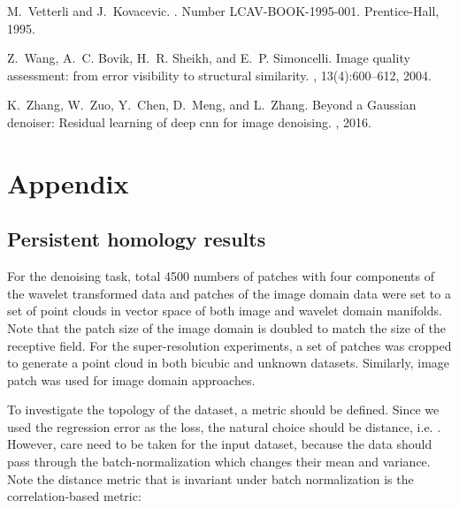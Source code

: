 \documentclass[10pt,twocolumn,letterpaper]{article}
\begin{document}
\begin{thebibliography}{10}
M.~Vetterli and J.~Kovacevic.
.
\newblock Number LCAV-BOOK-1995-001. Prentice-Hall, 1995.

Z.~Wang, A.~C. Bovik, H.~R. Sheikh, and E.~P. Simoncelli.
\newblock Image quality assessment: from error visibility to structural
  similarity.
, 13(4):600--612, 2004.

K.~Zhang, W.~Zuo, Y.~Chen, D.~Meng, and L.~Zhang.
\newblock Beyond a {Gaussian} denoiser: Residual learning of deep cnn for image
  denoising.
, 2016.

\end{thebibliography}








\maketitle






\clearpage
\section{Appendix}




\subsection{Persistent homology results}
\label{sec:ph_result}




For the denoising task, total 4500 numbers of  patches with four components of the wavelet transformed data and  patches of the image domain data were set to a set of point clouds in  vector space of both image and wavelet domain manifolds. Note that the patch size of the image domain is doubled to match the size of the receptive field.
For the super-resolution experiments, a set of  patches was cropped to generate a point cloud in both bicubic and unknown datasets. Similarly,  image patch was used for image domain approaches.

To investigate the topology of the dataset, a metric should be defined.
Since we used the  regression error as the loss, the natural choice should be  distance, i.e. .
However, care need to be taken for the input dataset, because the data should pass through the batch-normalization
which changes their mean and variance. 
Note the distance metric that is invariant under batch normalization is the correlation-based metric:
\end{document}

